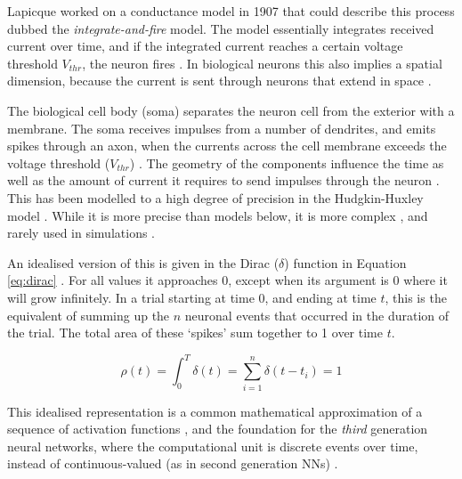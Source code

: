 \documentclass[report.tex]{subfiles}
\begin{document}
Lapicque worked on a conductance model in 1907 that could describe this
process dubbed the \textit{integrate-and-fire} 
model.
The model essentially integrates received current over time, and
if the integrated current reaches a certain voltage threshold $V_{thr}$, the neuron
fires \cite{Dayan2001, Eliasmith2004}.
In biological neurons this also implies a spatial dimension, because the
current is sent through	neurons that extend in space \cite{Dayan2001}.

The biological cell body (soma) separates the neuron cell from the
exterior with a membrane.
The soma receives impulses from a number
of dendrites, and emits spikes through an 
axon, when the currents across the cell membrane exceeds the
voltage threshold ($V_{thr}$) \cite{Dayan2001}.
The geometry of the components influence the time as well as the amount of current
it requires to send impulses through the neuron \cite{Eliasmith2004}.
This has been modelled to a high degree of precision in the 
Hudgkin-Huxley model \cite{Dayan2001}.
While it is more precise than models below, it is
more complex \cite[p. 195]{Dayan2001}, and rarely used in simulations
\cite{Albada2018, Dayan2001, Eliasmith2015}.

An idealised version of this is given in the Dirac ($\delta$) function 
in Equation \ref{eq:dirac} \cite[p. 404]{Dayan2001}.
For all values it approaches 0, except when its argument is
0 where it will grow infinitely.
In a trial starting at time $0$, and ending at time $t$, this
is the equivalent of summing up the $n$ neuronal events that occurred in 
the duration of the trial.
The total area of these `spikes' sum together to 1 over time $t$. 

\begin{equation} \label{eq:dirac}
  \rho(t) = \int_0^T \delta(t) = \sum_{i=1}^n \delta(t - t_i) = 1
\end{equation}

This idealised representation is a common mathematical approximation of
a sequence of activation functions \cite{Dayan2001, Eliasmith2004},
and the foundation for the \textit{third} generation
neural networks, where the computational unit is discrete events over time,
instead of continuous-valued (as in second generation \glspl{NN})
\cite{Maass1997}.
\end{document}

